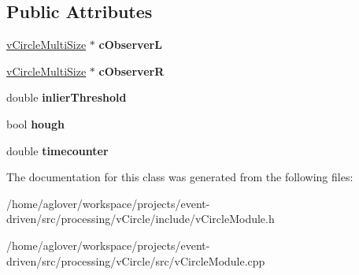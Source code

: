 \subsection*{Public Attributes}
\begin{DoxyCompactItemize}
\item 
\hyperlink{classvCircleMultiSize}{v\+Circle\+Multi\+Size} $\ast$ {\bfseries c\+ObserverL}\hypertarget{classvCircleReader_a75c47ee3024729fab391fc0098147430}{}\label{classvCircleReader_a75c47ee3024729fab391fc0098147430}

\item 
\hyperlink{classvCircleMultiSize}{v\+Circle\+Multi\+Size} $\ast$ {\bfseries c\+ObserverR}\hypertarget{classvCircleReader_a52940184b5d5f348813fdfdf1a62da48}{}\label{classvCircleReader_a52940184b5d5f348813fdfdf1a62da48}

\item 
double {\bfseries inlier\+Threshold}\hypertarget{classvCircleReader_abb1da4c345eb519b695927d12f2f1ec8}{}\label{classvCircleReader_abb1da4c345eb519b695927d12f2f1ec8}

\item 
bool {\bfseries hough}\hypertarget{classvCircleReader_a2a026b4c43ab7e721b6089b4118767a4}{}\label{classvCircleReader_a2a026b4c43ab7e721b6089b4118767a4}

\item 
double {\bfseries timecounter}\hypertarget{classvCircleReader_a0bcf9e8b5c28b2ea048ab75c4213023e}{}\label{classvCircleReader_a0bcf9e8b5c28b2ea048ab75c4213023e}

\end{DoxyCompactItemize}


The documentation for this class was generated from the following files\+:\begin{DoxyCompactItemize}
\item 
/home/aglover/workspace/projects/event-\/driven/src/processing/v\+Circle/include/v\+Circle\+Module.\+h\item 
/home/aglover/workspace/projects/event-\/driven/src/processing/v\+Circle/src/v\+Circle\+Module.\+cpp\end{DoxyCompactItemize}
